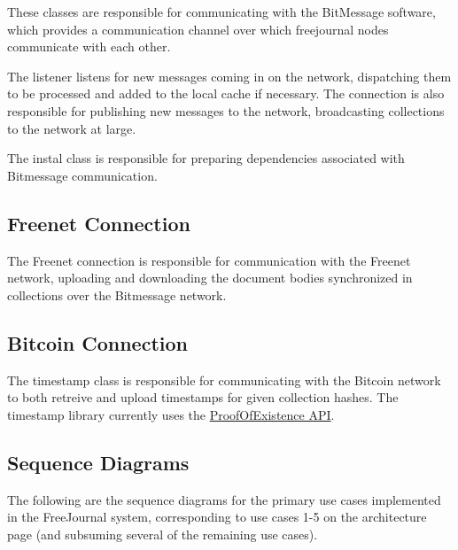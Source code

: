 \documentclass[letterpaper,10pt,oneside]{sphinxmanual}
\begin{document}



These classes are responsible for communicating with the BitMessage software, which
provides a communication channel over which freejournal nodes communicate with each other.

The listener listens for new messages coming in on the network, dispatching them to be processed
and added to the local cache if necessary.  The connection is also responsible for publishing
new messages to the network, broadcasting collections to the network at large.

The instal class is responsible for preparing dependencies associated with Bitmessage communication.


\subsection{Freenet Connection}
\label{architecture:freenet-connection}


The Freenet connection is responsible for communication with the Freenet network, uploading and downloading
the document bodies synchronized in collections over the Bitmessage network.


\subsection{Bitcoin Connection}
\label{architecture:bitcoin-connection}

The timestamp class is responsible for communicating with the Bitcoin network to both retreive and upload
timestamps for given collection hashes.  The timestamp library currently uses the \href{http://proofofexistence.com/}{ProofOfExistence API}.

\subsection{Sequence Diagrams}
\label{architecture:sequence-diagrams}
The following are the sequence diagrams for the primary use cases implemented in the FreeJournal system,
corresponding to use cases 1-5 on the architecture page (and subsuming several of the remaining use cases).
\end{document}
